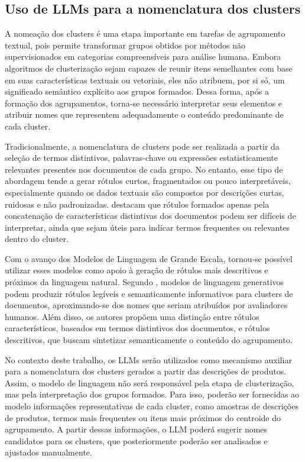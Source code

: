 \documentclass[english,brazilian]{UNISINOSmonografia}
\begin{document}
\subsection{Uso de LLMs para a nomenclatura dos clusters}

A nomeação dos clusters é uma etapa importante em tarefas de agrupamento textual, pois permite transformar grupos obtidos por métodos não supervisionados em categorias compreensíveis para análise humana. Embora algoritmos de clusterização sejam capazes de reunir itens semelhantes com base em suas características textuais ou vetoriais, eles não atribuem, por si só, um significado semântico explícito aos grupos formados. Dessa forma, após a formação dos agrupamentos, torna-se necessário interpretar seus elementos e atribuir nomes que representem adequadamente o conteúdo predominante de cada cluster.

Tradicionalmente, a nomenclatura de clusters pode ser realizada a partir da seleção de termos distintivos, palavras-chave ou expressões estatisticamente relevantes presentes nos documentos de cada grupo. No entanto, esse tipo de abordagem tende a gerar rótulos curtos, fragmentados ou pouco interpretáveis, especialmente quando os dados textuais são compostos por descrições curtas, ruidosas e não padronizadas. \cite{murray2025using} destacam que rótulos formados apenas pela concatenação de características distintivas dos documentos podem ser difíceis de interpretar, ainda que sejam úteis para indicar termos frequentes ou relevantes dentro do cluster.

Com o avanço dos Modelos de Linguagem de Grande Escala, tornou-se possível utilizar esses modelos como apoio à geração de rótulos mais descritivos e próximos da linguagem natural. Segundo \cite{murray2025using}, modelos de linguagem generativos podem produzir rótulos legíveis e semanticamente informativos para clusters de documentos, aproximando-se dos nomes que seriam atribuídos por avaliadores humanos. Além disso, os autores propõem uma distinção entre rótulos característicos, baseados em termos distintivos dos documentos, e rótulos descritivos, que buscam sintetizar semanticamente o conteúdo do agrupamento.

No contexto deste trabalho, os LLMs serão utilizados como mecanismo auxiliar para a nomenclatura dos clusters gerados a partir das descrições de produtos. Assim, o modelo de linguagem não será responsável pela etapa de clusterização, mas pela interpretação dos grupos formados. Para isso, poderão ser fornecidas ao modelo informações representativas de cada cluster, como amostras de descrições de produtos, termos mais frequentes ou itens mais próximos do centroide do agrupamento. A partir dessas informações, o LLM poderá sugerir nomes candidatos para os clusters, que posteriormente poderão ser analisados e ajustados manualmente.
\end{document}
